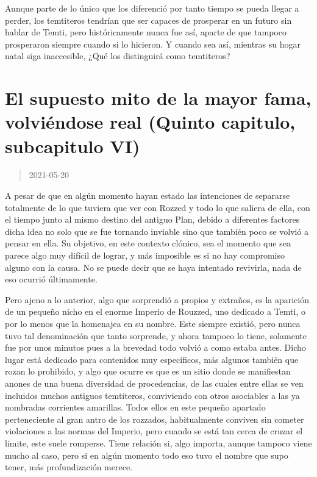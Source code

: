 \documentclass[
  spanish,
]{book}
\begin{document}
Aunque parte de lo único que los diferenció por tanto tiempo se pueda llegar a perder, los temtiteros tendrían que ser capaces de prosperar en un futuro sin hablar de Temti, pero históricamente nunca fue así, aparte de que tampoco prosperaron siempre cuando si lo hicieron. Y cuando sea así, mientras su hogar natal siga inaccesible, ¿Qué los distinguirá como temtiteros?

\hypertarget{el-supuesto-mito-de-la-mayor-fama-volviuxe9ndose-real-quinto-capitulo-subcapitulo-vi}{%
\section{El supuesto mito de la mayor fama, volviéndose real (Quinto capitulo, subcapitulo VI)}\label{el-supuesto-mito-de-la-mayor-fama-volviuxe9ndose-real-quinto-capitulo-subcapitulo-vi}}

\begin{quote}
2021-05-20
\end{quote}

A pesar de que en algún momento hayan estado las intenciones de separarse totalmente de lo que tuviera que ver con Rozzed y todo lo que saliera de ella, con el tiempo junto al mismo destino del antiguo Plan, debido a diferentes factores dicha idea no solo que se fue tornando inviable sino que también poco se volvió a pensar en ella. Su objetivo, en este contexto clónico, sea el momento que sea parece algo muy difícil de lograr, y más imposible es si no hay compromiso alguno con la causa. No se puede decir que se haya intentado revivirla, nada de eso ocurrió últimamente.

Pero ajeno a lo anterior, algo que sorprendió a propios y extraños, es la aparición de un pequeño nicho en el enorme Imperio de Rouzzed, uno dedicado a Temti, o por lo menos que la homenajea en su nombre. Este siempre existió, pero nunca tuvo tal denominación que tanto sorprende, y ahora tampoco lo tiene, solamente fue por unos minutos pues a la brevedad todo volvió a como estaba antes.
Dicho lugar está dedicado para contenidos muy específicos, más algunos también que rozan lo prohibido, y algo que ocurre es que es un sitio donde se manifiestan anones de una buena diversidad de procedencias, de las cuales entre ellas se ven incluidos muchos antiguos temtiteros, conviviendo con otros asociables a las ya nombradas corrientes amarillas. Todos ellos en este pequeño apartado perteneciente al gran antro de los rozzados, habitualmente conviven sin cometer violaciones a las normas del Imperio, pero cuando se está tan cerca de cruzar el limite, este suele romperse. Tiene relación si, algo importa, aunque tampoco viene mucho al caso, pero si en algún momento todo eso tuvo el nombre que supo tener, más profundización merece.
\end{document}
